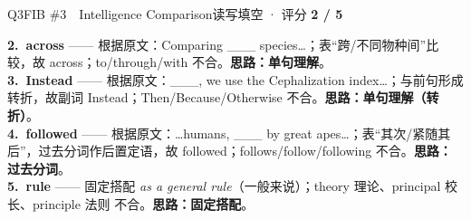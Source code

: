 \documentclass[11pt]{article}
\begin{document}
\begin{qblock}{Q3\quad FIB \#3\ \ Intelligence Comparison}{读写填空 · 评分 \textcolor{cAccent}{\bfseries 2 / 5}}
\begin{notebox}
\textbf{2.\ across} —— 根据原文：Comparing \_\_\_ species…；表“跨/不同物种间”比较，故 across；to/through/with 不合。\textbf{思路：单句理解}。\\[2pt]
\textbf{3.\ Instead} —— 根据原文：\_\_\_, we use the Cephalization index…；与前句形成转折，故副词 Instead；Then/Because/Otherwise 不合。\textbf{思路：单句理解（转折）}。\\[2pt]
\textbf{4.\ followed} —— 根据原文：…humans, \_\_\_ by great apes…；表“其次/紧随其后”，过去分词作后置定语，故 followed；follows/follow/following 不合。\textbf{思路：过去分词}。\\[2pt]
\textbf{5.\ rule} —— 固定搭配 \emph{as a general rule}（一般来说）；theory 理论、principal 校长、principle 法则 不合。\textbf{思路：固定搭配}。
\end{notebox}
\end{qblock}
\end{document}
